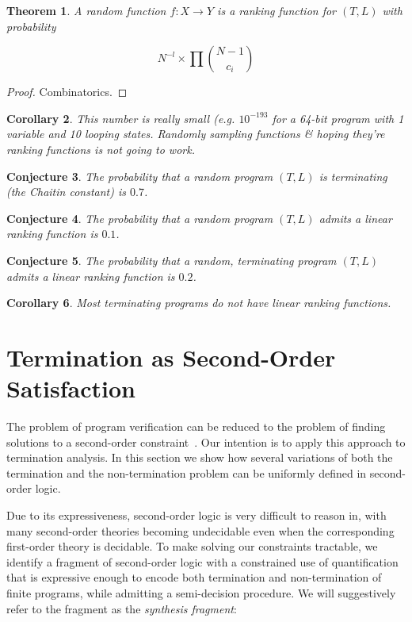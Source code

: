 \documentclass[preprint]{sigplanconf}
\newtheorem{theorem}{Theorem}
\newtheorem{corollary}[theorem]{Corollary}
\newtheorem{conjecture}[theorem]{Conjecture}
\theoremstyle{definition}
\begin{document}
\begin{theorem}
 A random function $f : X \to Y$ is a ranking function for $(T, L)$ with probability

 $$N^{-l} \times \prod {{N-1} \choose c_i}$$
\end{theorem}

\begin{proof}
 Combinatorics.
\end{proof}


\begin{corollary}
 This number is really small (e.g. $10^{-193}$ for a 64-bit program with 1 variable and 10 looping states.
 Randomly sampling functions \& hoping they're ranking functions is not going to work.
\end{corollary}


\begin{conjecture}
 The probability that a random program $(T, L)$ is terminating (the Chaitin constant)
 is $0.7$.
\end{conjecture}

\begin{conjecture}
 The probability that a random program $(T, L)$ admits a linear ranking function is
 $0.1$.
\end{conjecture}

\begin{conjecture}
 The probability that a random, terminating program $(T, L)$ admits a linear ranking function
 is $0.2$.
\end{conjecture}


\begin{corollary}
 Most terminating programs do not have linear ranking functions.
\end{corollary}
\fi


\section{Termination as Second-Order Satisfaction} \label{sec:second.order}


The problem of program verification can be reduced to the problem of finding
solutions to a second-order
constraint~\cite{DBLP:conf/pldi/GrebenshchikovLPR12,DBLP:conf/pldi/GulwaniSV08}. 
Our intention is to apply this approach to termination analysis.  In this
section we show how several variations of both the termination and the
non-termination problem can be uniformly defined in second-order logic.

Due to its expressiveness, second-order logic is very difficult to reason
in, with many second-order theories becoming undecidable even when the
corresponding first-order theory is decidable.
To make solving our constraints tractable, we identify a fragment of second-order logic
with a constrained use of quantification that is expressive enough to encode
both termination and non-termination of finite programs, while admitting a semi-decision procedure.
We will suggestively refer to the fragment as the \emph{synthesis fragment}:
\end{document}
